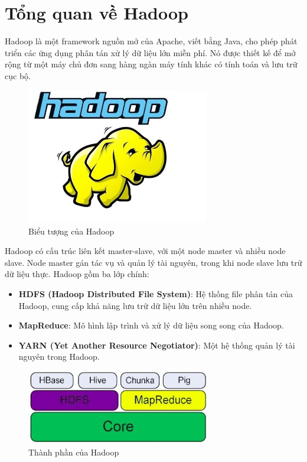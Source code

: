 \section{Tổng quan về Hadoop}
Hadoop là một framework nguồn mở của Apache, viết bằng Java, cho phép
phát triển các ứng dụng phân tán xử lý dữ liệu lớn miễn phí. Nó được
thiết kế để mở rộng từ một máy chủ đơn sang hàng ngàn máy tính khác có
tính toán và lưu trữ cục bộ.
\begin{figure}[ht]
    \centering
    \includegraphics[width=8cm]{images/Hadoop1.jpg}
    \caption{Biểu tượng của Hadoop}
\end{figure}
\newline
Hadoop có cấu trúc liên kết master-slave, với một node master và nhiều
node slave. Node master gán tác vụ và quản lý tài nguyên, trong khi node slave
lưu trữ dữ liệu thực. Hadoop gồm ba lớp chính:
\begin{itemize}
    \item \textbf{HDFS (Hadoop Distributed File System)}: Hệ thống file phân tán
          của Hadoop, cung cấp khả năng lưu trữ dữ liệu lớn trên nhiều node.
    \item \textbf{MapReduce}: Mô hình lập trình và xử lý dữ liệu song song
          của Hadoop.
    \item \textbf{YARN (Yet Another Resource Negotiator)}: Một hệ thống quản lý
          tài nguyên trong Hadoop.
\end{itemize}
\begin{figure}[ht]
    \centering
    \includegraphics[width=8cm]{images/Hadoop2.jpg}
    \caption{Thành phần của Hadoop}
\end{figure}

